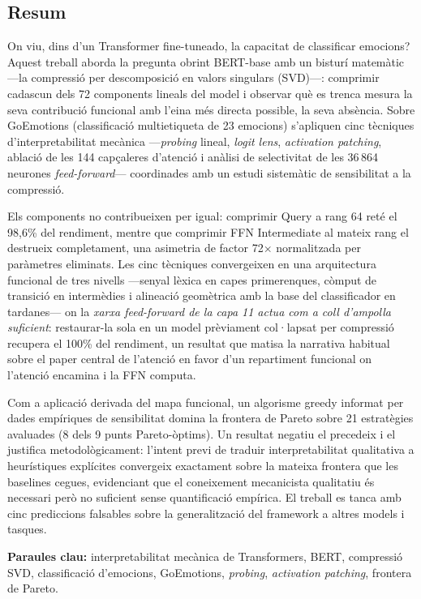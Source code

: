 \documentclass[11pt, a4paper]{article}
\begin{document}
\begin{otherlanguage}{catalan}
\section*{Resum}
\noindent
On viu, dins d'un Transformer fine-tuneado, la capacitat de classificar
emocions? Aquest treball aborda la pregunta obrint BERT-base amb un
bisturí matemàtic ---la compressió per descomposició en valors singulars
(SVD)---: comprimir cadascun dels 72 components lineals del model i
observar què es trenca mesura la seva contribució funcional amb l'eina
més directa possible, la seva absència. Sobre GoEmotions (classificació
multietiqueta de 23 emocions) s'apliquen cinc tècniques
d'interpretabilitat mecànica ---\emph{probing} lineal, \emph{logit lens},
\emph{activation patching}, ablació de les 144 capçaleres d'atenció i
anàlisi de selectivitat de les 36\,864 neurones \emph{feed-forward}---
coordinades amb un estudi sistemàtic de sensibilitat a la compressió.

Els components no contribueixen per igual: comprimir Query a rang 64
reté el 98{,}6\% del rendiment, mentre que comprimir FFN Intermediate al
mateix rang el destrueix completament, una asimetria de factor 72$\times$
normalitzada per paràmetres eliminats. Les cinc tècniques convergeixen
en una arquitectura funcional de tres nivells ---senyal lèxica en capes
primerenques, còmput de transició en intermèdies i alineació geomètrica
amb la base del classificador en tardanes--- on la \emph{xarxa
feed-forward de la capa 11 actua com a coll d'ampolla suficient}:
restaurar-la sola en un model prèviament col·lapsat per compressió
recupera el 100\% del rendiment, un resultat que matisa la narrativa
habitual sobre el paper central de l'atenció en favor d'un repartiment
funcional on l'atenció encamina i la FFN computa.

Com a aplicació derivada del mapa funcional, un algorisme greedy
informat per dades empíriques de sensibilitat domina la frontera de
Pareto sobre 21 estratègies avaluades (8 dels 9 punts Pareto-òptims).
Un resultat negatiu el precedeix i el justifica metodològicament: l'intent
previ de traduir interpretabilitat qualitativa a heurístiques explícites
convergeix exactament sobre la mateixa frontera que les baselines cegues,
evidenciant que el coneixement mecanicista qualitatiu és necessari però
no suficient sense quantificació empírica. El treball es tanca amb cinc
prediccions falsables sobre la generalització del framework a altres
models i tasques.

\textbf{Paraules clau:} interpretabilitat mecànica de Transformers, BERT,
compressió SVD, classificació d'emocions, GoEmotions, \emph{probing},
\emph{activation patching}, frontera de Pareto.
\end{otherlanguage}
\end{document}
